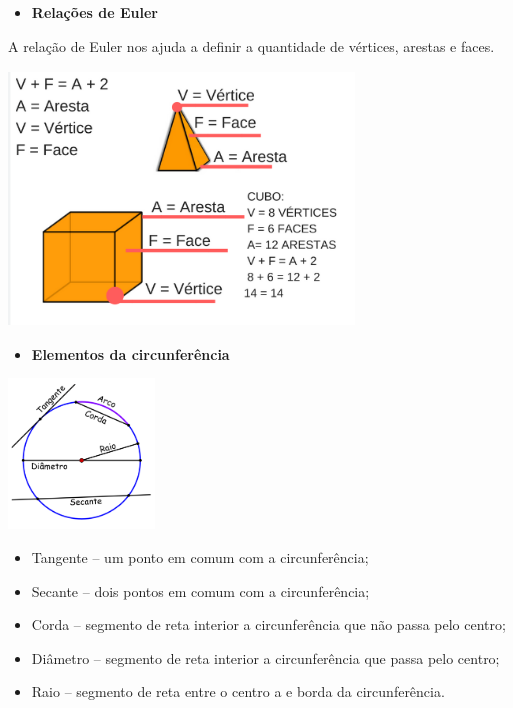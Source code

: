 \begin{escolha}
\begin{escolha}
{\begin{itemize}
  \item \textbf{Relações de Euler}
\end{itemize}

A relação de Euler nos ajuda a definir a quantidade de vértices, arestas
e faces.

\includegraphics[width=3.61979in,height=2.66667in]{./_SAEB_9_MAT/media/image162.png}

\begin{itemize}
  \item \textbf{Elementos da circunferência}
\end{itemize}

\includegraphics[width=1.53027in,height=1.57292in]{./_SAEB_9_MAT/media/image163.png}

\begin{itemize}
\item
  Tangente -- um ponto em comum com a circunferência;
\item
  Secante -- dois pontos em comum com a circunferência;
\item
  Corda -- segmento de reta interior a circunferência que não passa pelo
  centro;
\item
  Diâmetro -- segmento de reta interior a circunferência que passa pelo
  centro;
\item
  Raio -- segmento de reta entre o centro a e borda da circunferência.
\end{itemize}
} 


\end{escolha}
\end{escolha}

